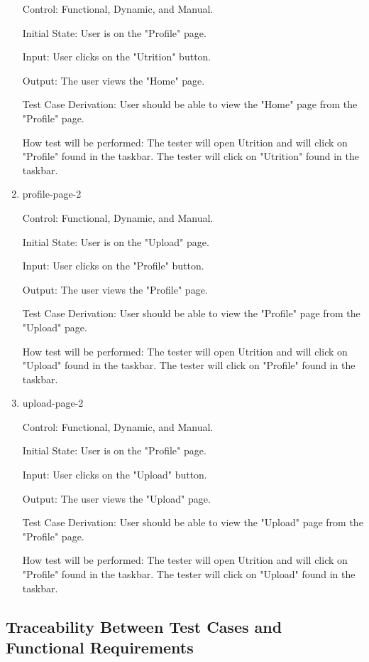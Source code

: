 \documentclass[12pt, titlepage]{article}
\begin{document}
\begin{enumerate}
		Control: Functional, Dynamic, and Manual.
		
		Initial State: User is on the "Profile" page.
		
		Input: User clicks on the "Utrition" button.
		
		Output: The user views the "Home" page.
		
		Test Case Derivation: User should be able to view the "Home" page from the "Profile" page.
		
		How test will be performed: The tester will open Utrition and will click on "Profile" found in the taskbar. The tester will click on "Utrition" found in the taskbar.
		
		\item{profile-page-2\\}
		
		Control: Functional, Dynamic, and Manual.
		
		Initial State: User is on the "Upload" page.
		
		Input: User clicks on the "Profile" button.
		
		Output: The user views the "Profile" page.
		
		Test Case Derivation: User should be able to view the "Profile" page from the "Upload" page.
		
		How test will be performed: The tester will open Utrition and will click on "Upload" found in the taskbar. The tester will click on "Profile" found in the taskbar.
		
		\item{upload-page-2\\}
		
		Control: Functional, Dynamic, and Manual.
		
		Initial State: User is on the "Profile" page.
		
		Input: User clicks on the "Upload" button.
		
		Output: The user views the "Upload" page.
		
		Test Case Derivation: User should be able to view the "Upload" page from the "Profile" page.
		
		How test will be performed: The tester will open Utrition and will click on "Profile" found in the taskbar. The tester will click on "Upload" found in the taskbar.
		
	\end{enumerate}
	
	\subsection{Traceability Between Test Cases and Functional Requirements}
	
\end{document}
